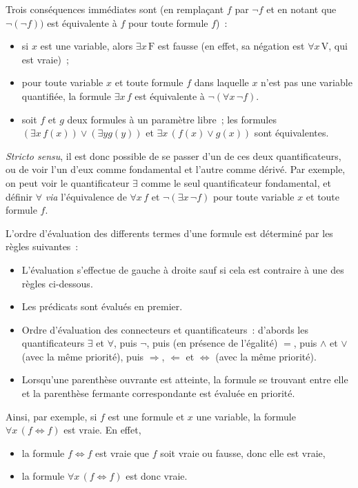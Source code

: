 Trois conséquences immédiates sont (en remplaçant $f$ par $\neg f$ et en notant que $\neg (\neg f))$ est équivalente à $f$ pour toute formule $f$) : 
\begin{itemize}
    \item si $x$ est une variable, alors $\exists x \, \mathrm{F}$ est fausse (en effet, sa négation est $\forall x \, \mathrm{V}$, qui est vraie) ; 
    \item pour toute variable $x$ et toute formule $f$ dans laquelle $x$ n'est pas une variable quantifiée, la formule $\exists x \, f$ est équivalente à $\neg (\forall x \, \neg f)$.
    \item soit $f$ et $g$ deux formules à un paramètre libre ; les formules $(\exists x \, f(x)) \vee (\exists y g(y))$ et $\exists x \, (f(x) \vee g(x))$ sont équivalentes.
\end{itemize}

\textit{Stricto sensu}, il est donc possible de se passer d'un de ces deux quantificateurs, ou de voir l'un d'eux comme fondamental et l'autre comme dérivé. 
Par exemple, on peut voir le quantificateur $\exists$ comme le seul quantificateur fondamental, et définir $\forall$ \textit{via} l'équivalence de $\forall x \, f$ et $\neg \left( \exists x \, \neg f \right)$ pour toute variable $x$ et toute formule $f$. 

L'ordre d'évaluation des differents termes d'une formule est déterminé par les règles suivantes : 
\begin{itemize}
    \item L'évaluation s'effectue de gauche à droite sauf si cela est contraire à une des règles ci-dessous.
    \item Les prédicats sont évalués en premier.
    \item Ordre d'évaluation des connecteurs et quantificateurs : d'abords les quantificateurs $\exists$ et $\forall$, puis $\neg$, puis (en présence de l'égalité) $=$, puis $\wedge$ et $\vee$ (avec la même priorité), puis $\Rightarrow$, $\Leftarrow$ et $\Leftrightarrow$ (avec la même priorité).
    \item Lorsqu'une parenthèse ouvrante est atteinte, la formule se trouvant entre elle et la parenthèse fermante correspondante est évaluée en priorité.
\end{itemize}

Ainsi, par exemple, si $f$ est une formule et $x$ une variable, la formule $\forall x \, (f \Leftrightarrow f)$ est vraie. 
En effet, 
\begin{itemize}[nosep]
    \item la formule $f \Leftrightarrow f$ est vraie que $f$ soit vraie ou fausse, donc elle est vraie,
    \item la formule $\forall x \, (f \Leftrightarrow f)$ est donc vraie.
\end{itemize}


